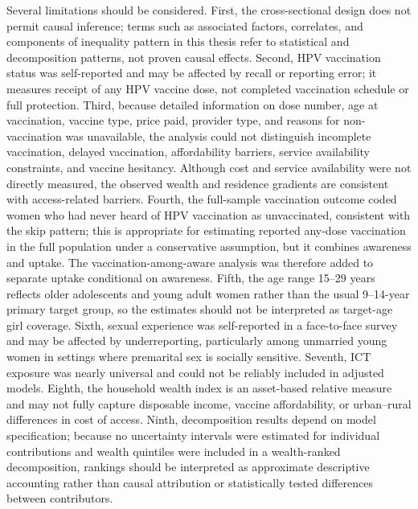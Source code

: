 Several limitations should be considered. First, the cross-sectional design does not permit causal inference; terms such as associated factors, correlates, and components of inequality pattern in this thesis refer to statistical and decomposition patterns, not proven causal effects. Second, HPV vaccination status was self-reported and may be affected by recall or reporting error; it measures receipt of any HPV vaccine dose, not completed vaccination schedule or full protection. Third, because detailed information on dose number, age at vaccination, vaccine type, price paid, provider type, and reasons for non-vaccination was unavailable, the analysis could not distinguish incomplete vaccination, delayed vaccination, affordability barriers, service availability constraints, and vaccine hesitancy. Although cost and service availability were not directly measured, the observed wealth and residence gradients are consistent with access-related barriers. Fourth, the full-sample vaccination outcome coded women who had never heard of HPV vaccination as unvaccinated, consistent with the skip pattern; this is appropriate for estimating reported any-dose vaccination in the full population under a conservative assumption, but it combines awareness and uptake. The vaccination-among-aware analysis was therefore added to separate uptake conditional on awareness. Fifth, the age range 15--29 years reflects older adolescents and young adult women rather than the usual 9--14-year primary target group, so the estimates should not be interpreted as target-age girl coverage. Sixth, sexual experience was self-reported in a face-to-face survey and may be affected by underreporting, particularly among unmarried young women in settings where premarital sex is socially sensitive. Seventh, ICT exposure was nearly universal and could not be reliably included in adjusted models. Eighth, the household wealth index is an asset-based relative measure and may not fully capture disposable income, vaccine affordability, or urban--rural differences in cost of access. Ninth, decomposition results depend on model specification; because no uncertainty intervals were estimated for individual contributions and wealth quintiles were included in a wealth-ranked decomposition, rankings should be interpreted as approximate descriptive accounting rather than causal attribution or statistically tested differences between contributors.

\clearpage
